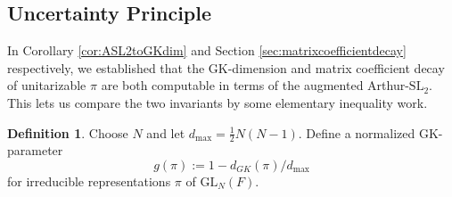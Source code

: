 \documentclass{amsart}
\newcommand{\f}{\frac}
\newcommand{\SL}{\mathrm{SL}}
\newcommand{\GL}{\mathrm{GL}}
\newcommand{\1}{\m 1}
\theoremstyle{remark}
\theoremstyle{definition}
\newtheorem{dfn}[thm]{Definition}
\numberwithin{equation}{subsection}
\newcommand{\red}[1]{\textcolor{red}{#1}}
\begin{document}






\subsection{Uncertainty Principle}

In Corollary \ref{cor:ASL2toGKdim} and Section \ref{sec:matrixcoefficientdecay} respectively, we established that the GK-dimension and matrix coefficient decay of unitarizable $\pi$ are both computable in terms of the augmented Arthur-$\SL_2$. This lets us compare the two invariants by some elementary inequality work. 

\begin{dfn}
   
Choose $N$ and let $d_{\max} = \frac12N(N-1)$. Define a normalized GK-parameter
\[
g(\pi) := 1 - d_{GK}(\pi)/d_{\max}
\]
for irreducible representations $\pi$ of $\GL_N(F)$. 
\end{dfn}
\end{document}
